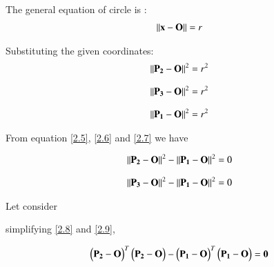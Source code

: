 \documentclass[journal,12pt,twocolumn]{IEEEtran}
\begin{document}
The general equation of circle is :
\begin{align}
\left\lVert\mathbf{x} - \mathbf{O}\right\rVert = r
\end{align}

Substituting the given coordinates:
\begin{align}
\left\lVert  \mathbf{P_2} - \mathbf{O}\right\rVert^{2} = r^{2} \label{2.5}
\end{align}

\begin{align}
\left\lVert  \mathbf{ P_3} - \mathbf{O}\right\rVert^{2} = r^{2} \label{2.6}
\end{align}


\begin{align}
\left\lVert  \mathbf{ P_1} - \mathbf{O}\right\rVert^{2} = r^{2} \label{2.7}
\end{align}

From equation \ref{2.5}, \ref{2.6} and \ref{2.7} we have 
%
%




\begin{align}
\left\lVert  \mathbf{ P_2} - \mathbf{O}\right\rVert^{2}  - \left\lVert \mathbf{P_1}  - \mathbf{O}\right\rVert^{2}   = 0 \label{2.8}
\end{align}

\begin{align}
\left\lVert \mathbf{ P_3} - \mathbf{O}\right\rVert^{2}   - \left\lVert\mathbf{ P_1} - \mathbf{O}\right\rVert^{2}  = 0 \label{2.9}
\end{align}

Let  consider
 
 simplifying   \ref{2.8} and \ref{2.9},



\begin{align}
\begin{pmatrix}\mathbf{P_2} - \mathbf{O}\end{pmatrix}^T \begin{pmatrix}\mathbf{P_2} - \mathbf{ O}\end{pmatrix} - \begin{pmatrix}\mathbf{P_1} - \mathbf{O}\end{pmatrix}^T\begin{pmatrix}\mathbf{P_1} - \mathbf{O}\end{pmatrix} = \mathbf{0} \label{2.10}
\end{align}
\end{document}
